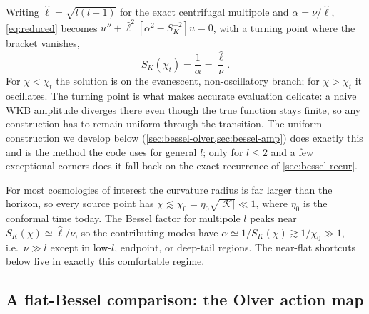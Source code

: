 \documentclass[prd, twocolumn, superscriptaddress, tightenlines, longbibliography, nofootinbib, eqsecnum, amsfonts, amsmath, floatfix, notitlepage]{revtex4-2}
\newcommand{\SK}{S_K}
\newcommand{\abs}[1]{\left|#1\right|}
\begin{document}
Writing $\hat\ell=\sqrt{l(l+1)}$ for the exact centrifugal multipole and
$\alpha=\nu/\hat\ell$, \cref{eq:reduced} becomes
$u''+\hat\ell^2[\alpha^2-\SK^{-2}]u=0$, with a turning point where the bracket
vanishes,
\begin{equation}
  \SK(\chi_t)=\frac1\alpha=\frac{\hat\ell}{\nu}.
  \label{eq:turning}
\end{equation}
For $\chi<\chi_t$ the solution is on the evanescent, non-oscillatory branch; for
$\chi>\chi_t$ it oscillates. The turning point is what makes accurate evaluation
delicate: a naive WKB amplitude diverges there even though the true function
stays finite, so any construction has to remain uniform through the transition.
The uniform construction we develop below (\cref{sec:bessel-olver,sec:bessel-amp})
does exactly this and is the method the code uses for general $l$; only for
$l\le2$ and a few exceptional corners does it fall back on the exact recurrence of
\cref{sec:bessel-recur}.

For most cosmologies of interest the curvature radius is far larger than the
horizon, so every source point has $\chi\lesssim\chi_0=\eta_0\sqrt{\abs{\mathcal
K}}\ll1$, where $\eta_0$ is the conformal time today. The Bessel factor for multipole $l$ peaks near $\SK(\chi)\simeq\hat\ell/\nu$,
so the contributing modes have $\alpha\simeq1/\SK(\chi)\gtrsim1/\chi_0\gg1$,
i.e.\ $\nu\gg l$ except in low-$l$, endpoint, or deep-tail regions. The near-flat
shortcuts below live in exactly this comfortable regime.

\subsection{A flat-Bessel comparison: the Olver action map}
\label{sec:bessel-olver}
\end{document}
